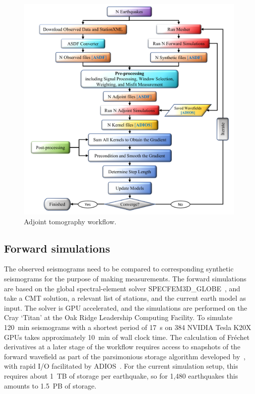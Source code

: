 \documentclass[extra,mreferee]{gji}
\begin{document}
\begin{figure}
  \centering
  \includegraphics[width=\textwidth]{figures/adjoint_workflow_6.pdf}
  \caption{Adjoint tomography workflow.}
  \label{fig:adjoint_workflow}
\end{figure}

\subsection{Forward simulations}

The observed seismograms need to be compared to corresponding synthetic seismograms
for the purpose of making measurements.
The forward simulations are based on the global spectral-element solver SPECFEM3D\_GLOBE~\citep{KoTr02a,KoTr02a},
and take a CMT solution, a relevant list of stations, and the current earth model as input.
The solver is GPU accelerated, and the simulations are performed on the Cray `Titan' at the Oak Ridge Leadership Computing Facility.
To simulate 120~min seismograms with a shortest period of 17~s on 384 NVIDIA Tesla K20X GPUs takes approximately 10~min of wall clock time.
The calculation of Fr\'echet derivatives at a later stage of the workflow requires access to snapshots of the forward wavefield as part of the parsimonious storage algorithm developed by~\cite{KoXiBoPeSaLiTr16},
with rapid I/O facilitated by ADIOS~\citep{liu2014hello}.
For the current simulation setup,
this requires about 1~TB of storage per earthquake,
so for 1,480 earthquakes this amounts to 1.5~PB of storage.
\end{document}
